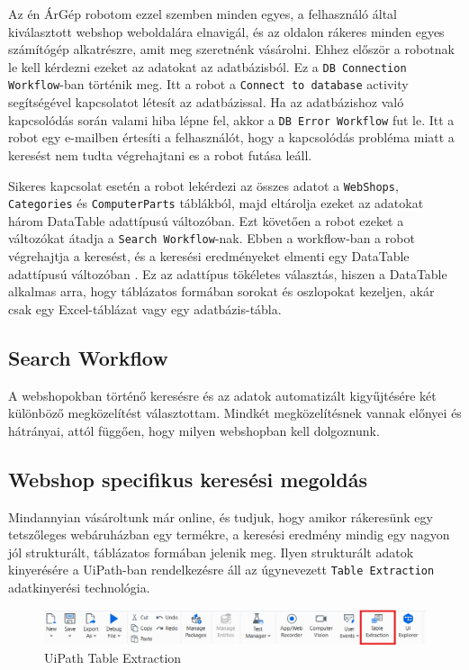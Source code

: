 \documentclass[
]{thesis-ekf}
\theoremstyle{definition}
\theoremstyle{remark}
\begin{document}
Az én ÁrGép robotom ezzel szemben minden egyes, a felhasználó által kiválasztott webshop weboldalára elnavigál, és az oldalon rákeres minden egyes számítógép alkatrészre, amit meg szeretnénk vásárolni. Ehhez először a robotnak le kell kérdezni ezeket az adatokat az adatbázisból. Ez a \texttt{DB Connection Workflow}-ban történik meg. Itt a robot a \texttt{Connect to database} activity segítségével kapcsolatot létesít az adatbázissal. Ha az adatbázishoz való kapcsolódás során valami hiba lépne fel, akkor a \texttt{DB Error Workflow} fut le. Itt a robot egy e-mailben értesíti a felhasználót, hogy a kapcsolódás probléma miatt a keresést nem tudta végrehajtani es a robot futása leáll. 

Sikeres kapcsolat esetén a robot lekérdezi az összes adatot a  \texttt{WebShops}, \texttt{Categories}  és \texttt{ComputerParts} táblákból, majd eltárolja ezeket az adatokat három DataTable adattípusú változóban. Ezt követően a robot ezeket a változókat átadja a \texttt{Search Workflow}-nak. Ebben a workflow-ban a robot végrehajtja a keresést, és a keresési eredményeket elmenti egy DataTable adattípusú változóban \cite{DataTable}. Ez az adattípus tökéletes választás, hiszen a DataTable alkalmas arra, hogy táblázatos formában sorokat és oszlopokat kezeljen, akár csak egy Excel-táblázat vagy egy adatbázis-tábla.

\subsection{Search Workflow}
A webshopokban történő keresésre és az adatok automatizált kigyűjtésére két különböző megközelítést választottam. Mindkét megközelítésnek vannak előnyei és hátrányai, attól függően, hogy milyen webshopban kell dolgoznunk.

\subsection*{Webshop specifikus keresési megoldás}
Mindannyian vásároltunk már online, és tudjuk, hogy amikor rákeresünk egy tetszőleges webáruházban egy termékre, a keresési eredmény mindig egy nagyon jól strukturált, táblázatos formában jelenik meg. Ilyen strukturált adatok kinyerésére a UiPath-ban rendelkezésre áll az úgynevezett \texttt{Table Extraction} \cite{TableExtraction} adatkinyerési technológia.

\begin{figure}[!ht]
	\centering
	\includegraphics[width=15.5cm]{tableExtraction2}
	\caption{ UiPath Table Extraction}
	\label{picture-TableExtraction}
\end{figure}
\end{document}
